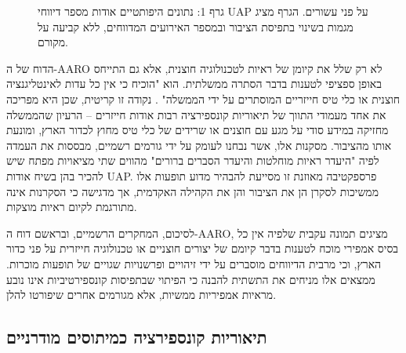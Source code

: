 \documentclass[12pt,a4paper]{article}
\begin{document}
\begin{figure}[h!]
    \centering
    \caption{גרף 1: נתונים היפותטיים אודות מספר דיווחי UAP על פני עשורים. הגרף מציג מגמות בשינוי בתפיסת הציבור ובמספר האירועים המדווחים, ללא קביעה על מקורם.}
    \label{fig:uap_reports_graph}
\end{figure}

הדוח של ה-AARO לא רק שלל את קיומן של ראיות לטכנולוגיה חוצנית, אלא גם התייחס באופן ספציפי לטענות בדבר הסתרה ממשלתית. הוא "הוכיח כי אין כל עדות לאינטליגנציה חוצנית או כלי טיס חייזריים המוסתרים על ידי הממשלה" \cite{aaro2024noevidence}. נקודה זו קריטית, שכן היא מפריכה את אחד מעמודי התווך של תיאוריות קונספירציה רבות אודות חייזרים – הרעיון שהממשלה מחזיקה במידע סודי על מגע עם חוצנים או שרידים של כלי טיס מחוץ לכדור הארץ, ומונעת אותו מהציבור. מסקנות אלו, אשר נבחנו לעומק על ידי גורמים רשמיים, מבססות את העמדה לפיה "היעדר ראיות מוחלטות והיעדר הסברים ברורים" \cite{aaro2024misidentification} מהווים שתי מציאויות מפתח שיש להכיר בהן בשיח אודות UAP. פרספקטיבה מאוזנת זו מסייעת להבהיר מדוע תופעות אלו ממשיכות לסקרן הן את הציבור והן את הקהילה האקדמית, אך מדגישה כי הסקרנות אינה מתורגמת לקיום ראיות מוצקות.

לסיכום, המחקרים הרשמיים, ובראשם דוח ה-AARO, מציגים תמונה עקבית שלפיה אין כל בסיס אמפירי מוכח לטענות בדבר קיומם של יצורים חוצניים או טכנולוגיה חייזרית על פני כדור הארץ, וכי מרבית הדיווחים מוסברים על ידי זיהויים ופרשנויות שגויים של תופעות מוכרות. ממצאים אלו מניחים את התשתית להבנה כי הפיתוי שבתפיסות קונספירטיביות אינו נובע מראיות אמפיריות ממשיות, אלא מגורמים אחרים שיפורטו להלן.

\subsection{תיאוריות קונספירציה כמיתוסים מודרניים}
\end{document}

